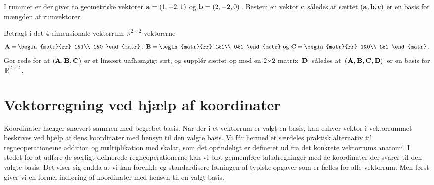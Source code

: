 \begin{exercise}
I rummet er der givet to geometriske vektorer $\mathbf{a}=(1,-2,1)$ og $\mathbf{b}=(2,-2,0)\,$. Bestem en vektor $\mathbf{c}$ således at sættet $(\mathbf{a},\mathbf{b},\mathbf{c})$ er en basis for mængden af rumvektorer. 
\end{exercise}

\begin{exercise}
Betragt i det 4-dimensionale vektorrum $\mathbb R^{2\times 2}$ vektorerne
\begin{equation}
\mathbf A=
\begin{matr}{rr}
 1&1\\
 1&0
 \end{matr}\,,\,\,
\mathbf B=
\begin{matr}{rr}
 1&1\\
 0&1
 \end{matr}\,\,\mathrm{og}\,\,
\mathbf C=
\begin{matr}{rr}
 1&0\\
 1&1
 \end{matr}\,.
\end{equation}
Gør rede for at $(\mathbf{A},\mathbf{B},\mathbf{C})$ er et lineært uafhængigt sæt, og supplér sættet op med en 2$\times$2 matrix $\,\mathbf{D}\,$ således at $\,(\mathbf{A},\mathbf{B},\mathbf{C},\mathbf{D})\,$ er en basis for $\,\mathbb R^{2\times 2}\,$.
\end{exercise}

\section{Vektorregning ved hjælp af koordinater}
Koordinater hænger snævert sammen med begrebet basis. Når der i et vektorrum er valgt\- en basis, kan enhver vektor i vektorrummet beskrives ved hjælp af dens koordinater med hensyn til den valgte basis. Vi får hermed et særdeles praktisk alternativ til regneoperationerne addition og multiplikation med skalar, som det oprindeligt er defineret ud fra det  konkrete vektorrums anatomi. I stedet for at udføre de særligt definerede regneoperationerne kan vi blot gennemføre taludregninger med de koordinater der svarer til den valgte basis. Det viser sig endda at vi kan forenkle og standardisere løsningen af typiske opgaver som er fælles for alle vektorrum. Men først giver vi en formel indføring af koordinater med hensyn til en valgt basis.

